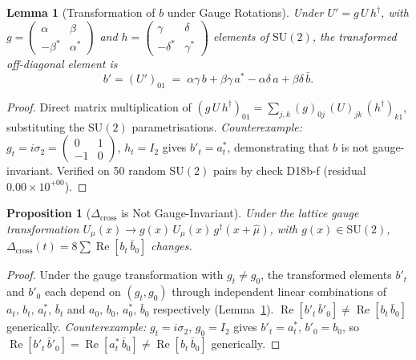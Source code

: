 \documentclass[12pt]{article}
\numberwithin{equation}{section}
\theoremstyle{plain}
\newtheorem{lemma}{Lemma}[section]
\newtheorem{proposition}{Proposition}[section]
\theoremstyle{definition}
\theoremstyle{remark}
\newcommand{\su}{\mathrm{SU}}              %
\newcommand{\Dcross}{\Delta_{\mathrm{cross}}}  %
\begin{document}
	\begin{lemma}[Transformation of $b$ under Gauge Rotations]
		\label{lem:b-transform}
		Under $U' = g\, U\, h^{\dagger}$, with
		$g = \begin{pmatrix}\alpha & \beta\\ -\beta^{*} & \alpha^{*}
		\end{pmatrix}$ and
		$h = \begin{pmatrix}\gamma & \delta\\ -\delta^{*} & \gamma^{*}
		\end{pmatrix}$ elements of $\su(2)$, the transformed off-diagonal
		element is
		\begin{equation}
			b' = (U')_{01}
			\;=\; \alpha\gamma\,b + \beta\gamma\,a^{*}
			- \alpha\delta\,a + \beta\delta\,\bar{b}.
			\label{eq:b-transform}
		\end{equation}
	\end{lemma}
	
	\begin{proof}
		Direct matrix multiplication of
		$(g\, U\, h^{\dagger})_{01}
		= \sum_{j,k}(g)_{0j}\,(U)_{jk}\,(h^{\dagger})_{k1}$,
		substituting the $\su(2)$ parametrisations.
		\emph{Counterexample:}
		$g_t = i\sigma_{2}
		= \begin{pmatrix}0 & 1\\ -1 & 0\end{pmatrix}$,
		$h_t = I_2$ gives $b'_t = a^{*}_t$, demonstrating that $b$ is
		not gauge-invariant.  Verified on 50 random $\su(2)$ pairs by
		check D18b-f (residual $0.00\times 10^{+00}$).
	\end{proof}
	
	\begin{proposition}[$\Dcross$ is Not Gauge-Invariant]
		\label{prop:gauge-noninv}
		Under the lattice gauge transformation
		$U_\mu(x) \to g(x)\,U_\mu(x)\,g^{\dagger}(x+\hat{\mu})$, with
		$g(x)\in\su(2)$, $\Dcross(t) = 8\sum
		\operatorname{Re}[b_t\,\bar{b}_0]$ changes.
	\end{proposition}
	
	\begin{proof}
		Under the gauge transformation with $g_t \neq g_0$, the
		transformed elements $b'_t$ and $b'_0$ each depend on $(g_t,g_0)$
		through independent linear combinations of
		$a_t,\,b_t,\,a^{*}_t,\,\bar{b}_t$ and
		$a_0,\,b_0,\,a^{*}_0,\,\bar{b}_0$ respectively
		(Lemma~\ref{lem:b-transform}).
		$\operatorname{Re}[b'_t\,\bar{b}'_0] \neq
		\operatorname{Re}[b_t\,\bar{b}_0]$ generically.
		\emph{Counterexample:} $g_t = i\sigma_{2}$, $g_0 = I_2$ gives
		$b'_t = a^{*}_t$, $b'_0 = b_0$, so
		$\operatorname{Re}[b'_t\,\bar{b}'_0]
		= \operatorname{Re}[a^{*}_t\,\bar{b}_0]
		\neq \operatorname{Re}[b_t\,\bar{b}_0]$ generically.
	\end{proof}
	
\end{document}
